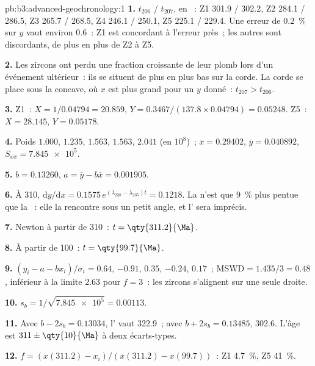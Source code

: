 \begin{solution}{pb:b3:advanced-geochronology:1}
\textbf{1.} $t_{206}$ / $t_{207}$, en \unit{\Ma}~: Z1 301.9 / 302.2, Z2 284.1 /
286.5, Z3 265.7 / 268.5, Z4 246.1 / 250.1, Z5 225.1 / 229.4. Une erreur de
\qty{0.2}{\percent} sur $y$ vaut environ \qty{0.6}{\Ma}~: Z1 est concordant
à l'erreur près~; les autres sont discordants, de plus en plus de Z2 à Z5.

\textbf{2.} Les zircons ont perdu une fraction croissante de leur plomb lors
d'un événement ultérieur~: ils se situent de plus en plus bas sur la corde. La corde se place sous la
 concave, où $x$ est plus grand pour un $y$ donné~: $t_{207} > t_{206}$.

\textbf{3.} Z1~: $X = 1/0.04794 = 20.859$, $Y = 0.3467/(137.8\times0.04794) =
0.05248$. Z5~: $X = 28.145$, $Y = 0.05178$.

\textbf{4.} Poids $1.000$, $1.235$, $1.563$, $1.563$, $2.041$ (en
$10^8$)~; $\bar x = 0.29402$, $\bar y = 0.040892$, $S_{xx} = \num{7.845e5}$.

\textbf{5.} $b = 0.13260$, $a = \bar y - b\bar x = 0.001905$.

\textbf{6.} À \qty{310}{\Ma}, $\mathrm dy/\mathrm dx = 0.1575\,
e^{(\lambda_{238} - \lambda_{235})t} = 0.1218$. La  n'est que
\qty{9}{\percent} plus pentue que la ~: elle la rencontre sous un petit angle,
et l' sera imprécis.

\textbf{7.} Newton à partir de \qty{310}{\Ma}~: $t = \qty{311.2}{\Ma}$.

\textbf{8.} À partir de \qty{100}{\Ma}~: $t = \qty{99.7}{\Ma}$.

\textbf{9.} $(y_i - a - bx_i)/\sigma_i = 0.64$, $-0.91$, $0.35$, $-0.24$,
$0.17$~; $\mathrm{MSWD} = 1.435/3 = 0.48$, inférieur à la limite $2.63$ pour $f = 3$~:
les zircons s'alignent sur une seule droite.

\textbf{10.} $s_b = 1/\sqrt{\num{7.845e5}} = 0.00113$.

\textbf{11.} Avec $b - 2s_b = 0.13034$, l' vaut
\qty{322.9}{\Ma}~; avec $b + 2s_b = 0.13485$, \qty{302.6}{\Ma}. L'âge est
$311 \pm \qty{10}{\Ma}$ à deux écarts-types.

\textbf{12.} $f = (x(311.2) - x_i)/(x(311.2) - x(99.7))$~: Z1 \qty{4.7}{\percent},
Z5 \qty{41}{\percent}.


\end{solution}
